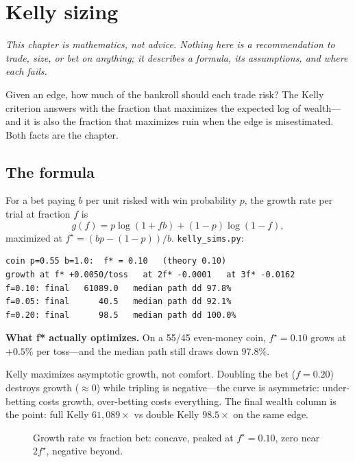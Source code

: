 \chapter{Kelly sizing}\label{ch:kelly}

\noindent\emph{This chapter is mathematics, not advice. Nothing here is a recommendation
to trade, size, or bet on anything; it describes a formula, its assumptions, and where
each fails.}

\vspace{1em}
\noindent Given an edge, how much of the bankroll should each trade risk? The Kelly
criterion answers with the fraction that maximizes the expected log of wealth---and it
is also the fraction that maximizes ruin when the edge is misestimated. Both facts are
the chapter.

\section{The formula}\label{sec:kelly}

For a bet paying $b$ per unit risked with win probability $p$, the growth rate per trial
at fraction $f$ is
\[
g(f)=p\log(1+fb)+(1-p)\log(1-f),
\]
maximized at $f^\star=(bp-(1-p))/b$. \texttt{kelly\_sims.py}:
\begin{lstlisting}[numbers=none]
coin p=0.55 b=1.0:  f* = 0.10   (theory 0.10)
growth at f* +0.0050/toss   at 2f* -0.0001   at 3f* -0.0162
f=0.10: final   61089.0   median path dd 97.8%
f=0.05: final      40.5   median path dd 92.1%
f=0.20: final      98.5   median path dd 100.0%
\end{lstlisting}

\begin{example}\label{ex:kelly}
\textbf{What f* actually optimizes.} On a 55/45 even-money coin, $f^\star=0.10$ grows at
$+0.5\%$ per toss---and the median path still draws down $97.8\%$.
\begin{solution}
Kelly maximizes asymptotic growth, not comfort. Doubling the bet ($f=0.20$) destroys
growth ($\approx0$) while tripling is negative---the curve is asymmetric: under-betting
costs growth, over-betting costs everything. The final wealth column is the point:
full Kelly $61{,}089\times$ vs double Kelly $98.5\times$ on the same edge.
\end{solution}
\end{example}

\begin{figure}[htbp]\centering

\caption{Growth rate vs fraction bet: concave, peaked at $f^\star=0.10$, zero near
$2f^\star$, negative beyond.}
\label{fig:kgrowth}
\end{figure}

